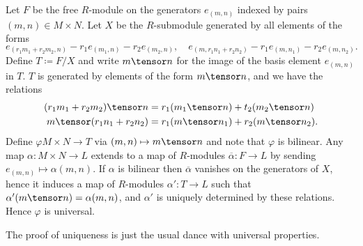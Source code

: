 Let $F$ be the free $R$-module on the generators $e_{(m, n)}$ indexed by pairs
$(m, n) \in M\times N$. Let $X$ be the $R$-submodule generated by all elements of
the forms
\[ e_{(r_1m_1 + r_2m_2, n)} - r_1e_{(m_1, n)}-r_2e_{(m_2, n)},\quad e_{(m, r_1n_1 + r_2n_2)} - r_1e_{(m, n_1)} - r_2e_{(m, n_2)}. \]
Define $T\coloneqq F/X$ and write $m\tensor n$ for the image of the basis element
$e_{(m, n)}$ in $T$. $T$ is generated by elements of the form $m\tensor n$, and we
have the relations
\begin{align*}
	(r_1m_1 + r_2m_2)\tensor n &= r_1(m_1\tensor n) + t_2(m_2\tensor n)\\
	m\tensor (r_1n_1 + r_2n_2) &= r_1(m\tensor n_1) + r_2(m\tensor n_2).
\end{align*}
Define $\varphi M\times N\to T$ via $(m, n)\mapsto m\tensor n$ and note that
$\varphi$ is bilinear. Any map $\alpha\colon M\times N\to L$ extends to a map
of $R$-modules $\overline{\alpha}\colon F\to L$ by sending
$e_{(m, n)} \mapsto \alpha(m, n)$. If $\alpha$ is bilinear then $\overline{\alpha}$
vanishes on the generators of $X$, hence it induces a map of $R$-modules
$\alpha'\colon T\to L$ such that $\alpha'(m\tensor n) = \alpha(m, n)$, and
$\alpha'$ is uniquely determined by these relations. Hence  $\varphi$ is
universal.

The proof of uniqueness is just the usual dance with universal properties.
